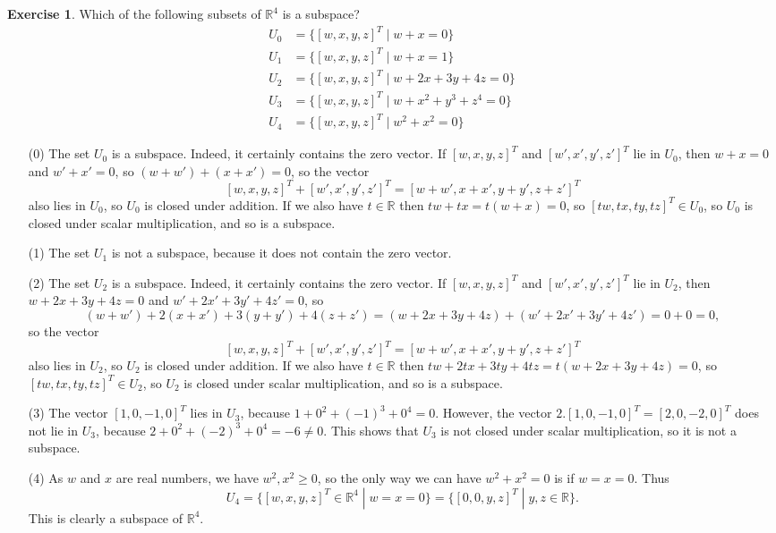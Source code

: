 \documentclass{amsart}
\newcommand{\R}         {{\mathbb{R}}}
\newcommand{\st}        {\;|\;}
\renewcommand{\:}       {\colon}
\theoremstyle{definition}
\newtheorem{exercise}{Exercise}[section]
\renewenvironment{solution}{\SolutionAtEnd}{\endSolutionAtEnd}
\begin{document}
\begin{exercise}
 Which of the following subsets of $\R^4$ is a subspace?
 \begin{align*}
  U_0 &= \{[w,x,y,z]^T \st w+x=0\} \\
  U_1 &= \{[w,x,y,z]^T \st w+x=1\} \\
  U_2 &= \{[w,x,y,z]^T \st w+2x+3y+4z=0\} \\
  U_3 &= \{[w,x,y,z]^T \st w+x^2+y^3+z^4=0\} \\
  U_4 &= \{[w,x,y,z]^T \st w^2 + x^2=0\}
 \end{align*}
\end{exercise}
\begin{solution}
 \begin{itemize}
  \item[(0)] The set $U_0$ is a subspace.  Indeed, it
   certainly contains the zero vector.  If $[w,x,y,z]^T$ and
   $[w',x',y',z']^T$ lie in $U_0$, then $w+x=0$ and $w'+x'=0$,
   so $(w+w')+(x+x')=0$, so the vector
   \[ [w,x,y,z]^T+[w',x',y',z']^T=[w+w',x+x',y+y',z+z']^T \]
   also lies in $U_0$, so $U_0$ is closed under addition.
   If we also have $t\in\R$ then $tw+tx=t(w+x)=0$, so
   $[tw,tx,ty,tz]^T\in U_0$, so $U_0$ is closed under scalar
   multiplication, and so is a subspace.
  \item[(1)] The set $U_1$ is not a subspace, because it
   does not contain the zero vector.
  \item[(2)] The set $U_2$ is a subspace.  Indeed, it
   certainly contains the zero vector.  If $[w,x,y,z]^T$ and
   $[w',x',y',z']^T$ lie in $U_2$, then $w+2x+3y+4z=0$ and
   $w'+2x'+3y'+4z'=0$, so 
   \[ (w+w')+2(x+x')+3(y+y')+4(z+z') = 
      (w+2x+3y+4z)+(w'+2x'+3y'+4z') = 0+0 = 0,
   \] 
   so the vector
   \[ [w,x,y,z]^T+[w',x',y',z']^T=[w+w',x+x',y+y',z+z']^T \]
   also lies in $U_2$, so $U_2$ is closed under addition.  If we
   also have $t\in\R$ then $tw+2tx+3ty+4tz=t(w+2x+3y+4z)=0$,
   so $[tw,tx,ty,tz]^T\in U_2$, so $U_2$ is closed under
   scalar multiplication, and so is a subspace.
  \item[(3)] The vector $[1,0,-1,0]^T$ lies in $U_3$, because
   $1+0^2+(-1)^3+0^4=0$.  However, the vector
   $2.[1,0,-1,0]^T=[2,0,-2,0]^T$ does not lie in $U_3$, because
   $2+0^2+(-2)^3+0^4=-6\neq 0$.  This shows that $U_3$ is
   not closed under scalar multiplication, so it is not a
   subspace.
  \item[(4)] As $w$ and $x$ are real numbers, we have
   $w^2,x^2\geq 0$, so the only way we can have $w^2+x^2=0$
   is if $w=x=0$.  Thus 
   \[ U_4 = \{[w,x,y,z]^T\in\R^4\st w=x=0\} = 
            \{[0,0,y,z]^T\st y,z\in\R\}. 
   \]
   This is clearly a subspace of $\R^4$.
 \end{itemize}
\end{solution}
\end{document}
